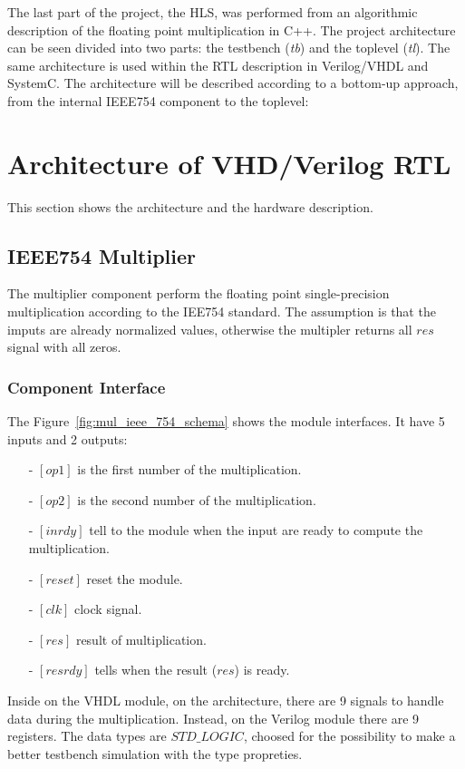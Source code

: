 \documentclass[]{IEEEtran}
\begin{document}
	The last part of the project, the HLS, was performed from an algorithmic description of the floating point multiplication in C++.
	The project architecture can be seen divided into two parts: the testbench (\textit{tb}) and the toplevel (\textit{tl}). The same architecture is used within the RTL description in Verilog/VHDL and SystemC.
	The architecture will be described according to a bottom-up approach, from the internal IEEE754 component to the toplevel:
	
	\section{Architecture of VHD/Verilog RTL}
	\label{sec:archvhdl}
	This section shows the architecture and the hardware description.
	
	\subsection{IEEE754 Multiplier}
	The multiplier component perform the floating point single-precision multiplication according to the IEE754 standard. The assumption is that the imputs are already normalized values, otherwise the multipler returns all $res$ signal with all zeros.
		
	\subsubsection{Component Interface}
	The Figure~\ref{fig:mul_ieee_754_schema} shows the module interfaces. It have 5 inputs and 2 outputs:
	\begin{itemize}
		\item [-] $[op1]$ is the first number of the multiplication.
		\item [-] $[op2]$ is the second number of the multiplication.
		\item [-] $[inrdy] $ tell to the module when the input are ready to compute the multiplication.
		\item [-] $[reset]$ reset the module.
		\item [-] $[clk]$ clock signal.
		\item [-] $[res]$ result of multiplication.
		\item [-] $[resrdy]$ tells when the result ($res$) is ready.
	\end{itemize}
	
	Inside on the VHDL module, on the architecture, there are 9 signals to handle data during the multiplication. Instead, on the Verilog module there are 9 registers. The data types are $STD\_LOGIC$, choosed for the possibility to make a better testbench simulation with the type propreties. 
	\\
	
\end{document}
